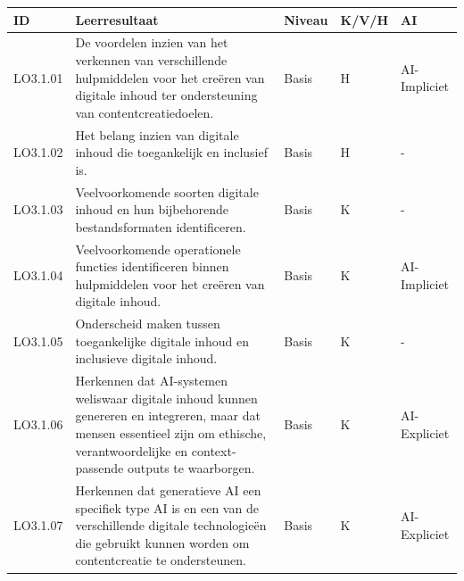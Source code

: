 \documentclass[
  dutch,
  letterpaper,
  DIV=11,
  numbers=noendperiod]{scrartcl}
\begin{document}
\begin{longtable}[]{@{}
  >{\centering\arraybackslash}p{}
  >{\centering\arraybackslash}p{}
  >{\centering\arraybackslash}p{}
  >{\centering\arraybackslash}p{}
  >{\centering\arraybackslash}p{}@{}}
\toprule\noalign{}
\begin{minipage}[b]{\linewidth}\centering
ID
\end{minipage} & \begin{minipage}[b]{\linewidth}\centering
Leerresultaat
\end{minipage} & \begin{minipage}[b]{\linewidth}\centering
Niveau
\end{minipage} & \begin{minipage}[b]{\linewidth}\centering
K/V/H
\end{minipage} & \begin{minipage}[b]{\linewidth}\centering
AI
\end{minipage} \\
\midrule\noalign{}
\endhead
\bottomrule\noalign{}
\endlastfoot
LO3.1.01 & De voordelen inzien van het verkennen van verschillende
hulpmiddelen voor het creëren van digitale inhoud ter ondersteuning van
contentcreatiedoelen. & Basis & H & AI-Impliciet \\
LO3.1.02 & Het belang inzien van digitale inhoud die toegankelijk en
inclusief is. & Basis & H & - \\
LO3.1.03 & Veelvoorkomende soorten digitale inhoud en hun bijbehorende
bestandsformaten identificeren. & Basis & K & - \\
LO3.1.04 & Veelvoorkomende operationele functies identificeren binnen
hulpmiddelen voor het creëren van digitale inhoud. & Basis & K &
AI-Impliciet \\
LO3.1.05 & Onderscheid maken tussen toegankelijke digitale inhoud en
inclusieve digitale inhoud. & Basis & K & - \\
LO3.1.06 & Herkennen dat AI-systemen weliswaar digitale inhoud kunnen
genereren en integreren, maar dat mensen essentieel zijn om ethische,
verantwoordelijke en context-passende outputs te waarborgen. & Basis & K
& AI-Expliciet \\
LO3.1.07 & Herkennen dat generatieve AI een specifiek type AI is en een
van de verschillende digitale technologieën die gebruikt kunnen worden
om contentcreatie te ondersteunen. & Basis & K & AI-Expliciet \\

\end{longtable}
\end{document}
